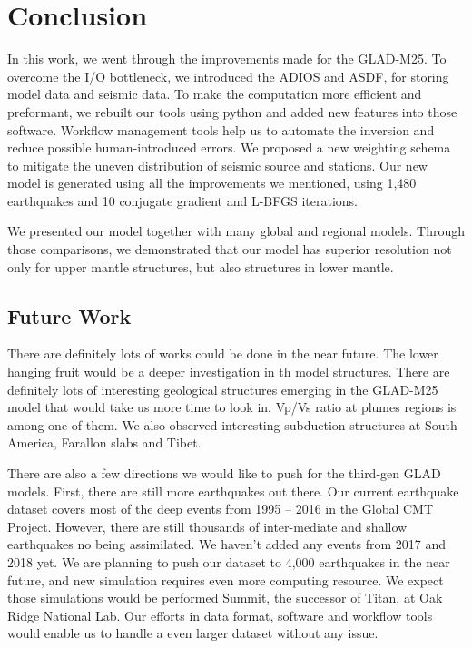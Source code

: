 \newpage
\chapter{Conclusion}
\label{ch:conclusion}

In this work, we went through the improvements made for the GLAD-M25.
To overcome the I/O bottleneck, we introduced the ADIOS and ASDF, for storing 
model data and seismic data. To make the computation more efficient and
preformant, we rebuilt our tools using python and added new features into
those software.
Workflow management tools help us to automate the inversion and reduce possible
human-introduced errors. We proposed a new weighting schema to
mitigate the uneven distribution of seismic source and stations.
Our new model is generated using all the improvements we mentioned,
using 1,480 earthquakes and 10 conjugate gradient and L-BFGS iterations.

We presented our model together with many global and regional models. Through
those comparisons, we demonstrated that our model has superior resolution
not only for upper mantle structures, but also structures in lower mantle.

\section{Future Work}

There are definitely lots of works could be done in the near future.
The lower hanging fruit would be a deeper investigation in th model structures.
There are definitely lots of interesting geological structures emerging in the
GLAD-M25 model that would take us more time to look in. Vp/Vs ratio at
plumes regions is among one of them.
We also observed interesting subduction structures at South America,
Farallon slabs and Tibet.

There are also a few directions we would like to push for the third-gen GLAD
models. First, there are still more earthquakes out there. Our current earthquake
dataset covers most of the deep events from 1995 -- 2016 in the Global CMT Project.
However, there are still thousands of inter-mediate and shallow earthquakes no being
assimilated. We haven't added any events from 2017 and 2018 yet. We are planning
to push our dataset to 4,000 earthquakes in the near future, and new simulation
requires even more computing resource. We expect those simulations would be
performed Summit, the successor of Titan, at Oak Ridge National Lab. Our efforts 
in data format, software and workflow tools would enable us to handle a
even larger dataset without any issue.

